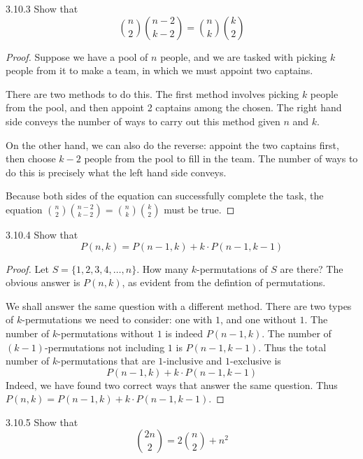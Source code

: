 \documentclass{exam}
\begin{document}
\begin{problem}{3.10.3}
    Show that $$\binom{n}2\binom{n-2}{k-2}=\binom{n}k\binom{k}2$$
\end{problem}

\begin{proof}
    Suppose we have a pool of $n$ people, and we are tasked with picking $k$ people from it to make a team, in which we must appoint two captains.

    There are two methods to do this. The first method involves picking $k$ people from the pool, and then appoint 2 captains among the chosen. The right hand side conveys the number of ways to carry out this method given $n$ and $k$.

    On the other hand, we can also do the reverse: appoint the two captains first, then choose $k-2$ people from the pool to fill in the team. The number of ways to do this is precisely what the left hand side conveys.

    Because both sides of the equation can successfully complete the task, the equation $\binom{n}2\binom{n-2}{k-2}=\binom{n}k\binom{k}2$ must be true.
\end{proof}

\begin{problem}{3.10.4}
    Show that $$P(n, k) = P(n-1,k)+k\cdot P(n-1, k-1)$$
\end{problem}

\begin{proof}
    Let $S = \{1, 2, 3, 4, \dots, n\}$. How many $k$-permutations of $S$ are there? The obvious answer is $P(n, k)$, as evident from the defintion of permutations.

    We shall answer the same question with a different method. There are two types of $k$-permutations we need to consider: one with $1$, and one without $1$. The number of $k$-permutations without $1$ is indeed $P(n-1,k)$. The number of $(k-1)$-permutations not including $1$ is $P(n-1, k-1)$. Thus the total number of $k$-permutations that are $1$-inclusive and $1$-exclusive is \[
    P(n-1, k) + k\cdot P(n-1, k-1)
    \]
    Indeed, we have found two correct ways that answer the same question. Thus $P(n, k) = P(n-1,k)+k\cdot P(n-1, k-1)$.
\end{proof}

\begin{problem}{3.10.5}
    Show that $$\binom{2n}{2} = 2\binom{n}2 + n^2$$
\end{problem}
\end{document}
